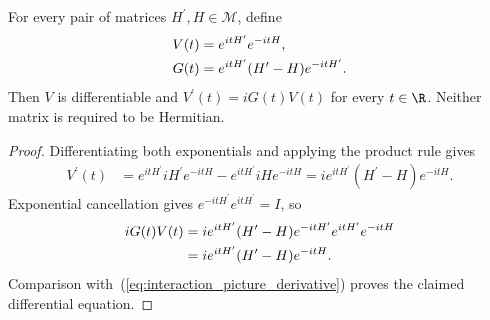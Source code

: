 \begin{theorem}
    \label{thm:interaction_picture_derivative}
    \leanok
    For every pair of matrices $H^{\prime},H\in\mathcal M$, define
    \begin{align}
        V(t)&=e^{itH^{\prime}}e^{-itH},
        \label{eq:interaction_picture_product}\\
        G(t)&=e^{itH^{\prime}}(H^{\prime}-H)e^{-itH^{\prime}}.\notag
    \end{align}
    Then $V$ is differentiable and $V^{\prime}(t)=iG(t)V(t)$ for every
    $t\in\R$. Neither matrix is required to be Hermitian.
\end{theorem}
\begin{proof}\leanok
    Differentiating both exponentials and applying the product rule gives
    \begin{align}
        V^{\prime}(t)&=e^{itH^{\prime}}iH^{\prime}e^{-itH}-e^{itH^{\prime}}iHe^{-itH}
            =i e^{itH^{\prime}}(H^{\prime}-H)e^{-itH}.
        \label{eq:interaction_picture_derivative}
    \end{align}
    Exponential cancellation gives $e^{-itH^{\prime}}e^{itH^{\prime}}=I$, so
    \begin{align}
        iG(t)V(t)
            &=i e^{itH^{\prime}}(H^{\prime}-H)e^{-itH^{\prime}}e^{itH^{\prime}}e^{-itH}\notag\\
            &=i e^{itH^{\prime}}(H^{\prime}-H)e^{-itH}.\notag
    \end{align}
    Comparison with~(\ref{eq:interaction_picture_derivative}) proves the
    claimed differential equation.
\end{proof}

